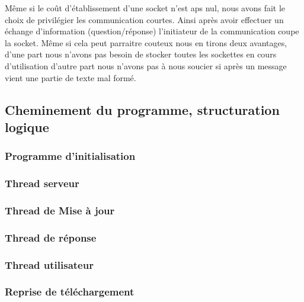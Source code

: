 Même si le coût d'établissement d'une socket n'est aps nul, nous avons
fait le choix de privilégier les communication courtes. Ainsi après
avoir effectuer un échange d'information (question/réponse)
l'initiateur de la communication coupe la socket. Même si cela peut
parraitre couteux nous en tirons deux avantages, d'une part nous
n'avons pas besoin de stocker toutes les sockettes en cours
d'utilisation d'autre part nous n'avons pas à nous soucier si après un
message vient une partie de texte mal formé.


\subsection{Cheminement du programme, structuration logique}

\subsubsection{Programme d'initialisation}

\subsubsection{Thread serveur}

\subsubsection{Thread de Mise à jour}

\subsubsection{Thread de réponse}

\subsubsection{Thread utilisateur}

\subsubsection{Reprise de téléchargement}


